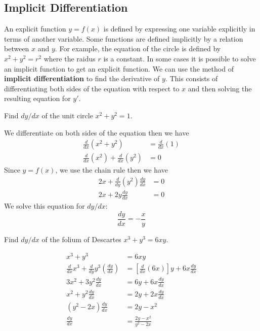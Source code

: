 \subsection{Implicit Differentiation}

An explicit function \(y=f(x)\) is defined by expressing one variable
explicitly in terms of another variable.
Some functions are defined implicitly by a relation between \(x\) and \(y\).
For example, the equation of the circle is defined by \(x^2+y^2=r^2\)
where the raidus \(r\) is a constant.
In some cases it is possible to solve an implicit function to get an explicit function.
We can use the method of \textbf{implicit differentiation} to find the derivative
of \(y\).
This consists of differentiating both sides of the equation with respect to
\(x\) and then solving the resulting equation for \(y'\).
\begin{problem}
    Find \(dy/dx\) of the unit circle \(x^2+y^2=1\).
\end{problem}
\begin{solution}
    We differentiate on both sides of the equation then we have
    \begin{align*}
        \frac{d}{dx}(x^2+y^2) &= \frac{d}{dx}(1) \\
        \frac{d}{dx}(x^2)+\frac{d}{dx}(y^2) &= 0
    \end{align*}
    Since \(y=f(x)\), we use the chain rule then we have
    \begin{align*}
        2x+\frac{d}{dy}(y^2)\frac{dy}{dx} &= 0 \\
        2x+2y\frac{dy}{dx} &= 0
    \end{align*}
    We solve this equation for \(dy/dx\):
    \[\frac{dy}{dx}=-\frac{x}{y}\]
\end{solution}
\begin{problem}
    Find \(dy/dx\) of the folium of Descartes \(x^3+y^3=6xy\).
\end{problem}
\begin{solution}
    \begin{align*}
        x^3+y^3 &= 6xy \\
        \frac{d}{dx}x^3+\frac{d}{dy}y^3\left(\frac{dy}{dx}\right)
        &= \left[\frac{d}{dx}(6x)\right]y+6x\frac{dy}{dx} \\
        3x^2+3y^2\frac{dy}{dx} &= 6y+6x\frac{dy}{dx} \\
        x^2+y^2\frac{dy}{dx} &= 2y+2x\frac{dy}{dx} \\
        (y^2-2x)\frac{dy}{dx} &= 2y-x^2 \\
        \frac{dy}{dx} &= \frac{2y-x^2}{y^2-2x} 
    \end{align*}
\end{solution}
